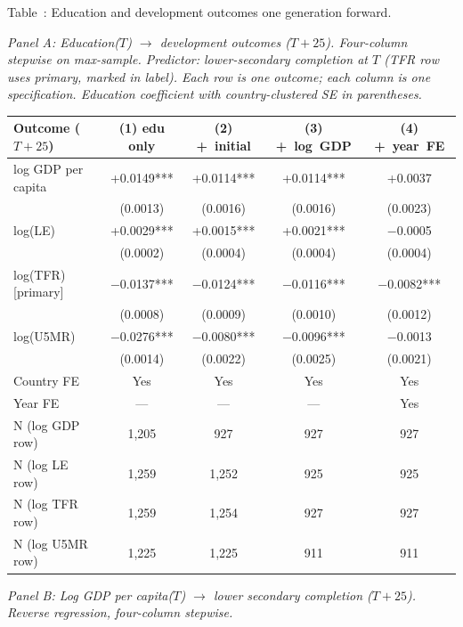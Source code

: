 \documentclass[12pt,letterpaper]{article}
\begin{document}
\label{tab:edu-outcomes}Table~\thetable: Education and development outcomes one generation forward.

\noindent\textit{Panel A: Education($T$) $\to$ development outcomes ($T{+}25$). Four-column stepwise on max-sample. Predictor: lower-secondary completion at $T$ (TFR row uses primary, marked in label). Each row is one outcome; each column is one specification. Education coefficient with country-clustered SE in parentheses.}

{\setlength{\tabcolsep}{4pt}
\begin{longtable}[]{@{}lcccc@{}}
\toprule
Outcome ($T{+}25$)   & (1) edu only & (2) +~initial & (3) +~log~GDP & (4) +~year~FE \\
\midrule
\endhead
log GDP per capita     & +0.0149*** & +0.0114*** & +0.0114*** & +0.0037\hphantom{***} \\
                       & (0.0013)   & (0.0016)   & (0.0016)   & (0.0023)              \\
log(LE)                & +0.0029*** & +0.0015*** & +0.0021*** & $-$0.0005\hphantom{***} \\
                       & (0.0002)   & (0.0004)   & (0.0004)   & (0.0004)              \\
log(TFR) [primary]    & $-$0.0137*** & $-$0.0124*** & $-$0.0116*** & $-$0.0082*** \\
                       & (0.0008)   & (0.0009)   & (0.0010)   & (0.0012)              \\
log(U5MR)              & $-$0.0276*** & $-$0.0080*** & $-$0.0096*** & $-$0.0013\hphantom{***} \\
                       & (0.0014)   & (0.0022)   & (0.0025)   & (0.0021)              \\
\midrule
Country FE             & Yes   & Yes   & Yes   & Yes \\
Year FE                & ---   & ---   & ---   & Yes \\
N (log GDP row)        & 1{,}205 & 927 & 927 & 927 \\
N (log LE row)         & 1{,}259 & 1{,}252 & 925 & 925 \\
N (log TFR row)        & 1{,}259 & 1{,}254 & 927 & 927 \\
N (log U5MR row)       & 1{,}225 & 1{,}225 & 911 & 911 \\
\bottomrule
\end{longtable}}

\vspace{0.5em}
\noindent\textit{Panel B: Log GDP per capita($T$) $\to$ lower secondary completion ($T{+}25$). Reverse regression, four-column stepwise.}
\end{document}
